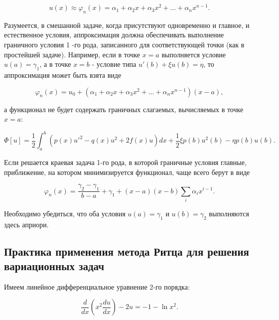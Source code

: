 \documentclass{article}
\begin{document}
\begin{displaymath}
	u(x) \approx \varphi_{n}(x) = \alpha_{1} + \alpha_{2}x + \alpha_{3}x^{2} + \dots + \alpha_{n}x^{n-1}.
\end{displaymath}

Разумеется, в смешанной задаче, когда присутствуют одновременно и главное, и естественное условия, аппроксимация должна обеспечивать выполнение граничного условия 1 -го рода, записанного для соответствующей точки (как в простейшей задаче). Например, если в точке $x = a$ выполняется условие $u(a) = \gamma_{1}$, а в точке $x = b$ - условие типа $u'(b) + \xi u(b) = \eta$, то аппроксимация может быть взята виде

\begin{displaymath}
	\varphi_{n}(x) = u_{0} + \left( \alpha_{1} + \alpha_{2}x + \alpha_{3}x^{2} + \dots + \alpha_{n}x^{n-1} \right) \left( x - a \right),
\end{displaymath}

\noindent а функционал не будет содержать граничных слагаемых, вычисляемых в точке $x = a$:

\begin{displaymath}
	\Phi[u] = \frac{1}{2} \int_{a}^{b} \left( p(x)u'^{2} - q(x)u^{2} + 2f(x)u \right)dx + \frac{1}{2} \xi p(b) u^{2}(b) - \eta p(b)u(b).
\end{displaymath}

Если решается краевая задача 1-го рода, в которой граничные условия главные, приближение, на котором минимизируется функционал, чаще всего берут в виде

\begin{displaymath}
	\varphi_{n}(x) = \frac{\gamma_{2} - \gamma_{1} }{ b - a } + \gamma_{1} + (x-a)(x-b) \sum_{i} \alpha_{i} x^{i - 1}.
\end{displaymath}

\begin{warn}[Важно!]
	Необходимо убедиться, что оба условия $u(a) = \gamma_{1}$ и $u(b) = \gamma_{2}$ выполняются здесь априори.
\end{warn}

\subsection{Практика применения метода Ритца для решения вариационных задач}

Имеем линейное дифференциальное уравнение 2-го порядка:

\begin{displaymath}
	\frac{d}{dx} \left( x^2 \frac{d u}{dx} \right) - 2u = -1 - \ln{x^2}.
\end{displaymath}
\end{document}
